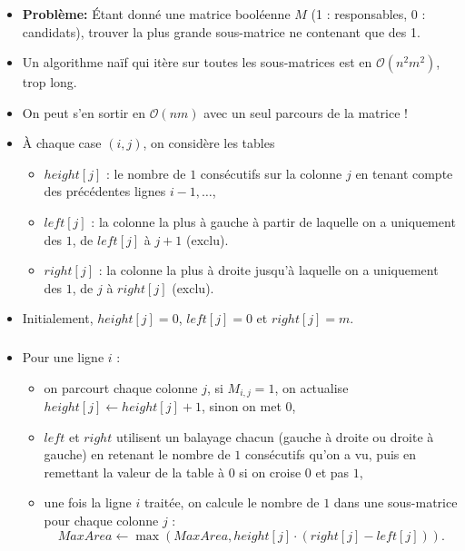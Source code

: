 \begin{frame}
    \frametitle{\problemtitle}
    \begin{itemize}
        \item<+-> \textbf{Problème:} Étant donné une matrice booléenne $M$ (1 : responsables, 0 : candidats), trouver la plus grande sous-matrice ne contenant que des 1.
        \item<+-> Un algorithme naïf qui itère sur toutes les sous-matrices est en $\mathcal{O}(n^2m^2)$, trop long.
        \item<+-> On peut s'en sortir en $\mathcal{O}(nm)$ avec un seul parcours de la matrice !
        \item<+-> À chaque case $(i,j)$, on considère les tables
                  \begin{itemize}
                     \item $height[j]$ : le nombre de $1$ consécutifs sur la colonne $j$ en tenant compte des précédentes lignes $i-1,\dots$,
                     \item $left[j]$ : la colonne la plus à gauche à partir de laquelle on a uniquement des $1$, de $left[j]$ à $j+1$ (exclu).
                     \item $right[j]$ : la colonne la plus à droite jusqu'à laquelle on a uniquement des $1$, de $j$ à $right[j]$ (exclu).
                  \end{itemize}
        \item<+-> Initialement, $height[j]=0$, $left[j]=0$ et $right[j]=m$.
    \end{itemize}
\end{frame}

\begin{frame}
    \frametitle{\problemtitle}
    \begin{itemize}
        \item<+-> Pour une ligne $i$ :
          \begin{itemize}
             \item on parcourt chaque colonne $j$, si $M_{i,j}=1$, on actualise $height[j]\leftarrow height[j]+1$, sinon on met $0$,
             \item $left$ et $right$ utilisent un balayage chacun (gauche à droite ou droite à gauche) en retenant le nombre de $1$ consécutifs qu'on a vu, puis en remettant la valeur de la table à $0$ si on croise $0$ et pas $1$,
             \item<+-> une fois la ligne $i$ traitée, on calcule le nombre de $1$ dans une sous-matrice pour chaque colonne $j$ : \[MaxArea \leftarrow \max(MaxArea, height[j]\cdot (right[j]-left[j])).\]
          \end{itemize}
    \end{itemize}
    \solvestats
\end{frame}